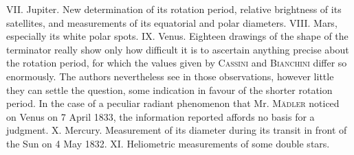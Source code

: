 VII. Jupiter. New determination of its rotation period, relative brightness of its satellites, and measurements of its equatorial and polar diameters.
VIII. Mars, especially its white polar spots.
IX. Venus. Eighteen drawings of the shape of the terminator really show only how difficult it is to ascertain anything precise about the rotation period, for which the values given by \textsc{Cassini} and \textsc{Bianchini} differ so enormously. The authors nevertheless see in those observations, however little they can settle the question, some indication in favour of the shorter rotation period. In the case of a peculiar radiant phenomenon that Mr. \textsc{Mädler} noticed on Venus on 7 April 1833, the information reported affords no basis for a judgment.
X. Mercury. Measurement of its diameter during its transit in front of the Sun on 4 May 1832.
XI. Heliometric measurements of some double stars.
